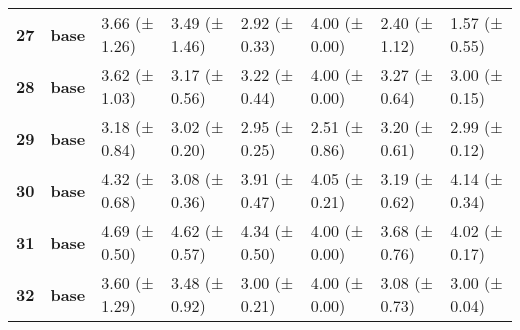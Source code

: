 \begin{longtable}{llllllll}
\cline{1-8}
\textbf{27} & \textbf{base} & 3.66 (± 1.26) & 3.49 (± 1.46) & 2.92 (± 0.33) & 4.00 (± 0.00) & 2.40 (± 1.12) & 1.57 (± 0.55) \\
\cline{1-8}
\textbf{28} & \textbf{base} & 3.62 (± 1.03) & 3.17 (± 0.56) & 3.22 (± 0.44) & 4.00 (± 0.00) & 3.27 (± 0.64) & 3.00 (± 0.15) \\
\cline{1-8}
\textbf{29} & \textbf{base} & 3.18 (± 0.84) & 3.02 (± 0.20) & 2.95 (± 0.25) & 2.51 (± 0.86) & 3.20 (± 0.61) & 2.99 (± 0.12) \\
\cline{1-8}
\textbf{30} & \textbf{base} & 4.32 (± 0.68) & 3.08 (± 0.36) & 3.91 (± 0.47) & 4.05 (± 0.21) & 3.19 (± 0.62) & 4.14 (± 0.34) \\
\cline{1-8}
\textbf{31} & \textbf{base} & 4.69 (± 0.50) & 4.62 (± 0.57) & 4.34 (± 0.50) & 4.00 (± 0.00) & 3.68 (± 0.76) & 4.02 (± 0.17) \\
\cline{1-8}
\textbf{32} & \textbf{base} & 3.60 (± 1.29) & 3.48 (± 0.92) & 3.00 (± 0.21) & 4.00 (± 0.00) & 3.08 (± 0.73) & 3.00 (± 0.04) \\
\cline{1-8}
\end{longtable}
